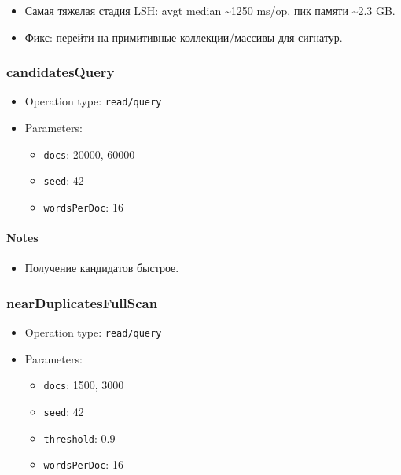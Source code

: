 \documentclass[
  10pt,
]{article}
\providecommand{\tightlist}{%
  \setlength{\itemsep}{0pt}\setlength{\parskip}{0pt}}
\begin{document}
\begin{itemize}
\tightlist
\item
  Самая тяжелая стадия LSH: avgt median \textasciitilde1250 ms/op, пик
  памяти \textasciitilde2.3 GB.
\item
  Фикс: перейти на примитивные коллекции/массивы для сигнатур.
\end{itemize}

\subsubsection{candidatesQuery}\label{candidatesquery}

\begin{itemize}
\tightlist
\item
  Operation type: \texttt{read/query}
\item
  Parameters:

  \begin{itemize}
  \tightlist
  \item
    \texttt{docs}: 20000, 60000
  \item
    \texttt{seed}: 42
  \item
    \texttt{wordsPerDoc}: 16
  \end{itemize}
\end{itemize}

\paragraph{Notes}\label{notes-8}

\begin{itemize}
\tightlist
\item
  Получение кандидатов быстрое.
\end{itemize}

\subsubsection{nearDuplicatesFullScan}\label{nearduplicatesfullscan}

\begin{itemize}
\tightlist
\item
  Operation type: \texttt{read/query}
\item
  Parameters:

  \begin{itemize}
  \tightlist
  \item
    \texttt{docs}: 1500, 3000
  \item
    \texttt{seed}: 42
  \item
    \texttt{threshold}: 0.9
  \item
    \texttt{wordsPerDoc}: 16
  \end{itemize}
\end{itemize}
\end{document}
